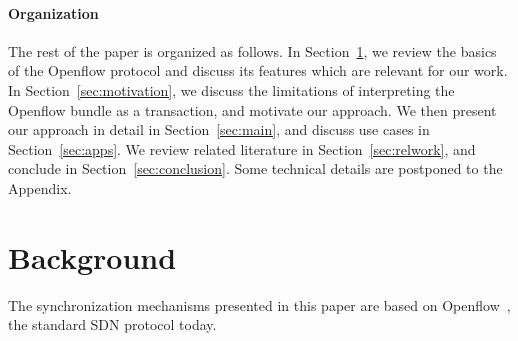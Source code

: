 \documentclass[conference]{sigcomm-alternate}
\begin{document}
\paragraph{Organization}
The rest of the paper is organized as follows.
In Section~\ref{sec:background}, we review the basics of the  Openflow
protocol and discuss its features which are relevant for our work.
In Section~\ref{sec:motivation}, we discuss the limitations of interpreting
the Openflow bundle as a transaction, and motivate our approach.
We then present our approach in detail in Section~\ref{sec:main}, and discuss use cases in Section~\ref{sec:apps}.
We review related literature in Section~\ref{sec:relwork}, and conclude
in Section~\ref{sec:conclusion}. Some technical details are postponed
to the Appendix.


\section{Background}\label{sec:background}

The synchronization mechanisms presented in this paper
are based on Openflow~\cite{of-spec}, the standard SDN protocol today.
\end{document}
